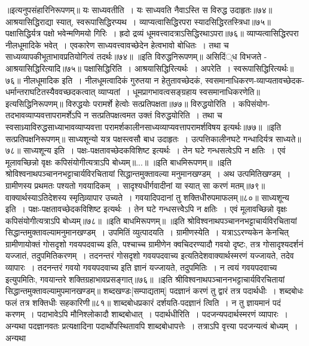 ॥इत्यनुपसंहारिनिरूपणम्॥
यः साध्यवतीति~।
यः साध्यवति नैवाऽस्ति स विरुद्ध उदाहृतः॥७४॥
आश्रयासिद्धिराद्या स्यात्, स्वरूपासिद्धिरप्यथ~।
व्याप्यत्वासिद्धिरपरा स्यादसिद्धिरतस्त्रिधा॥७५॥
पक्षासिद्धिर्यत्र पक्षो भवेन्मणिमयो गिरिः~।
ह्रदो द्रव्यं धूमवत्त्वादत्राऽसिद्धिरथाऽपरा॥७६॥
व्याप्यत्वासिद्धिरपरा नीलधूमादिके भवेत्~।
एवकारेण साध्यवत्त्वावच्छेदेन हेत्वभावो बोधितः~। तथा च साध्यव्यापकीभूताभावप्रतियोगित्वं तदर्थः॥७४॥
॥इति विरुद्धनिरूपणम्॥
असिदिं्ध विभजते - आश्रयासिद्धिरित्यादि॥७५॥
पक्षासिद्धिरिति~। आश्रयासिद्धिरित्यर्थः~।
अपरेति~। स्वरूपासिद्धिरित्यर्थः॥७६॥
नीलधूमादिक इति~। नीलधूमत्वादिकं गुरुतया न हेतुतावच्छेदकं, स्वसमानाधिकरण-व्याप्यतावच्छेदक-धर्मान्तराघटितस्यैववच्छदकत्वात् व्याप्यतां~। धूमप्रागभावत्वसङ्ग्रहाय
स्वसमानाधिकरणेति॥इत्यसिद्धिनिरूपणम्॥
विरुद्धयोः परामर्शे हेत्वोः सत्प्रतिपक्षता॥७७॥
विरुद्धयोरिति~। कपिसंयोग-तदभावव्याप्यवत्तापरामर्शेऽपि न सत्प्रतिपक्षत्वमत उक्तं विरुद्धयोरिति~। तथा च स्वसाध्र्याविरुद्धसाध्याभावव्याप्यवत्ता
परामर्शकालीनसाध्यव्याप्यवत्तापरामर्शविषय इत्यर्थः॥७७॥
॥इति सत्प्रतिपक्षनिरूपणम्॥
साध्यशून्यो यत्र पक्षस्त्वसौ बाध उदाहृतः~।
उत्पत्तिकालीनघटे गन्धादिर्यत्र साध्यते॥७८॥
साध्यशून्य इति~। पक्षः-पक्षतावच्छेदकविशिष्ट इत्यर्थः~। तेन घटे गन्धसत्वेऽपि न क्षतिः~। एवं मूलावच्छिन्नो वृक्षः कपिसंयोगीत्यत्राऽपि बोध्यम्॥...॥
॥इति बाधमिरूपणम्॥
॥इति श्रोविश्वनाथपञ्चाननभट्टाचार्यविरचितायां सिद्धान्तमुक्तावल्या मनुमानखण्डम्~।
अथ उत्पमितिखण्डम्~।
ग्रामीणस्य प्रथमतः पश्यतो गवयादिकम्~।
सादृश्यधीर्गवादीनां या स्यात् सा करणं मतम्॥७९॥
वाक्यार्थस्याऽतिदेशस्य स्मृतिव्र्यापार उच्यते~।
गवयादिपदानां तु शक्तिधीरुपमाफलम्॥८०॥
साध्यशून्य इति~। पक्षः-पक्षतावच्छेदकविशिष्ट इत्यर्थः~। तेन घटे गन्धसत्त्वेेऽपि न क्षतिः~। एवं मूलावच्छिन्नो वृक्षः कपिसंयोगीत्यत्राऽपि बोध्यम्॥७८॥
॥इति बाधमिरूपणम्॥
॥इति श्रोविश्वनाथपञ्चाननभट्टाचार्यविरचितायां सिद्धान्तमुक्तावल्यामनुमानखण्डम्~।
उपमितिं व्युत्पादयति~। ग्रामीणस्येति~। यत्राऽऽरण्यकेन केनचित् ग्रामीणायोक्तं गोसदृशो गवयपदवाच्य इति, पश्चाच्च ग्रामीणेन क्वचिदरण्यादौ गवयो दृष्टः, तत्र
गोसादृश्यदर्शनं यज्जातं, तदुपमितिकरणम्~। तदनन्तरं गोसदृशो गवयपदवाच्य इत्यतिदेशवाक्यार्थस्मरणं यज्जायते, तदेव व्यापारः~। तदनन्तरं गवयो गवयपदवाच्य इति
ज्ञानं यज्जायते, तदुपमितिः~। न त्वयं गवयपदवाच्य इत्युपमितिः, गवयान्तरे शक्तिग्रहाभावप्रसङ्गात्॥७६॥
॥इति श्रीविश्वनाथपञ्चाननभट्टाचार्यविरचितायां सिद्धान्तमुक्तावल्यामुपमानखण्डम्॥
शब्दखण्डः[सम्पाद्यताम्]
पदज्ञानं करणं तु द्वारं तत्र पदार्थधीः~।
शब्दबोधः फलं तत्र शक्तिधीः सहकारिणी॥८१॥
शाब्दबोधप्रकारं दर्शयति-पदज्ञानं त्विति~। न तु ज्ञायमानं पदं करणम्~। पदाभावेऽपि मौनिश्लोकादौ शाब्दबोधात्~।
पदार्थधीरिति~। पदजन्यपदार्थस्मरणं व्यापारः~। अन्यथा पदज्ञानवतः प्रत्यक्षादिना पदार्थोपस्थितावपि शाब्दबोधापत्तेः~। तत्राऽपि वृत्त्या पदजन्यत्वं बोध्यम्~। अन्यथा

